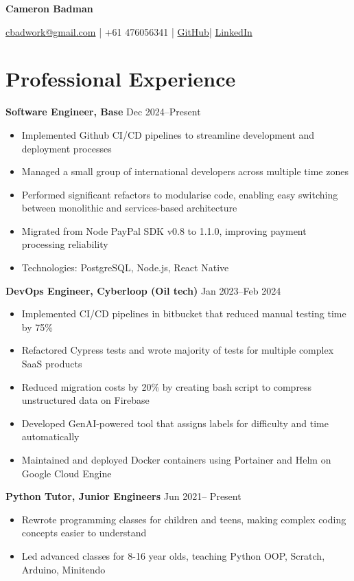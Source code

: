 \documentclass[10pt,a4paper]{article}
\begin{document}
	\begin{center}
		{\huge\textbf{Cameron Badman}}
		\begin{center}
			\href{mailto:cbadwork@gmail.com}{cbadwork@gmail.com} |
			+61 476056341 |
			\href{https://github.com/CameronBadman}{GitHub}| 
			\href{https://www.linkedin.com/in/cameron-badman-5314ba1b8/}{LinkedIn}
		\end{center}
	\end{center}
	
	\section{Professional Experience}
	\textbf{Software Engineer, Base} \hfill Dec 2024--Present 
	\begin{itemize}[label=\textbullet, itemsep=0.02cm]
		\item Implemented Github CI/CD pipelines to streamline development and deployment processes
		\item Managed a small group of international developers across multiple time zones
		\item Performed significant refactors to modularise code, enabling easy switching between monolithic and services-based architecture
		\item Migrated from Node PayPal SDK v0.8 to 1.1.0, improving payment processing reliability
		\item Technologies: PostgreSQL, Node.js, React Native
	\end{itemize}
	
	\textbf{DevOps Engineer, Cyberloop (Oil tech)} \hfill Jan 2023--Feb 2024 
	\begin{itemize}[label=\textbullet, itemsep=0.02cm]
		\item Implemented CI/CD pipelines in bitbucket that reduced manual testing time by 75\%
		\item Refactored Cypress tests and wrote majority of tests for multiple complex SaaS products
		\item Reduced migration costs by 20\% by creating bash script to compress unstructured data on Firebase
		\item Developed GenAI-powered tool that assigns labels for difficulty and time automatically
		\item Maintained and deployed Docker containers using Portainer and Helm on Google Cloud Engine
	\end{itemize}
	
	\textbf{Python Tutor, Junior Engineers} \hfill Jun 2021-- Present 
	\begin{itemize}[label=\textbullet, itemsep=0.02cm]
		\item Rewrote programming classes for children and teens, making complex coding concepts easier to understand
		\item Led advanced classes for 8-16 year olds, teaching Python OOP, Scratch, Arduino, Minitendo
	\end{itemize}
	
\end{document}
